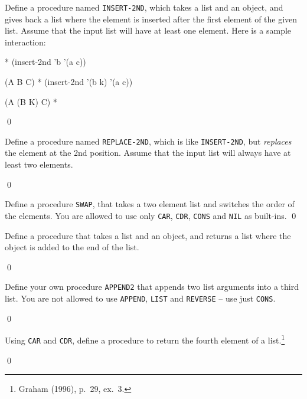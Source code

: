 \documentclass[a4paper,11pt]{article}
\begin{document}
\noindent\hrulefill

\begin{uexercise}
Define a procedure named \Verb+INSERT-2ND+, which takes a list and an object, and gives back a list where the element is inserted after the first element of the given list. Assume that the input list will have at least one element. Here is a sample interaction:

\begin{lispcode}
* (insert-2nd 'b '(a c))

(A B C)
* (insert-2nd '(b k) '(a c))

(A (B K) C)
* 
\end{lispcode}

\qed
\end{uexercise}

\begin{uexercise}
Define a procedure named \Verb+REPLACE-2ND+, which is like \Verb+INSERT-2ND+, but \emph{replaces} the element at the 2nd position. Assume that the input list will always have at least two elements.

\qed
\end{uexercise}

\begin{uexercise}

Define a procedure \Verb+SWAP+, that takes a two element list and switches the order of the elements. You are allowed to use only \Verb+CAR+, \Verb+CDR+, \Verb+CONS+ and \Verb+NIL+ as built-ins.
\qed
\end{uexercise}

\begin{uexercise}
Define a procedure that takes a list and an object, and returns a list where the object is added to the end of the list.

\qed
\end{uexercise}

\begin{uexercise}
Define your own procedure \Verb+APPEND2+ that appends two list arguments into a third list. You are not allowed to use \Verb+APPEND+, \Verb+LIST+ and \Verb+REVERSE+ -- use just \Verb+CONS+.

\qed
\end{uexercise}

\begin{uexercise}
Using \Verb+CAR+ and \Verb+CDR+, define a procedure to return the fourth element of a list.\footnote{Graham (1996), p.\ 29, ex.\ 3.} 

\qed
\end{uexercise}
\end{document}

